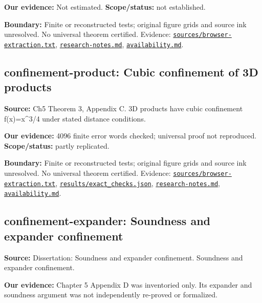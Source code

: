 \documentclass[11pt]{article}
\begin{document}
\textbf{Our evidence:} Not estimated. \textbf{Scope/status:} not established.

\textbf{Boundary:} Finite or reconstructed tests; original figure grids and source ink unresolved. No universal theorem certified. Evidence: \href{https://github.com/alectionary/vibe-math/blob/master/formalization/quintavalle-hgp/sources/browser-extraction.txt}{\nolinkurl{sources/browser-extraction.txt}}, \href{https://github.com/alectionary/vibe-math/blob/master/formalization/quintavalle-hgp/research-notes.md}{\nolinkurl{research-notes.md}}, \href{https://github.com/alectionary/vibe-math/blob/master/formalization/quintavalle-hgp/availability.md}{\nolinkurl{availability.md}}.
\subsection{confinement-product: Cubic confinement of 3D products}
\label{claim:confinement-product}
\textbf{Source:} Ch5 Theorem 3, Appendix C. 3D products have cubic confinement f(x)=x\textasciicircum{}3/4 under stated distance conditions.

\textbf{Our evidence:} 4096 finite error words checked; universal proof not reproduced. \textbf{Scope/status:} partly replicated.

\textbf{Boundary:} Finite or reconstructed tests; original figure grids and source ink unresolved. No universal theorem certified. Evidence: \href{https://github.com/alectionary/vibe-math/blob/master/formalization/quintavalle-hgp/sources/browser-extraction.txt}{\nolinkurl{sources/browser-extraction.txt}}, \href{https://github.com/alectionary/vibe-math/blob/master/formalization/quintavalle-hgp/results/exact_checks.json}{\nolinkurl{results/exact_checks.json}}, \href{https://github.com/alectionary/vibe-math/blob/master/formalization/quintavalle-hgp/research-notes.md}{\nolinkurl{research-notes.md}}, \href{https://github.com/alectionary/vibe-math/blob/master/formalization/quintavalle-hgp/availability.md}{\nolinkurl{availability.md}}.
\subsection{confinement-expander: Soundness and expander confinement}
\label{claim:confinement-expander}
\textbf{Source:} Dissertation: Soundness and expander confinement. Soundness and expander confinement.

\textbf{Our evidence:} Chapter 5 Appendix D was inventoried only. Its expander and soundness argument was not independently re-proved or formalized.
\end{document}
